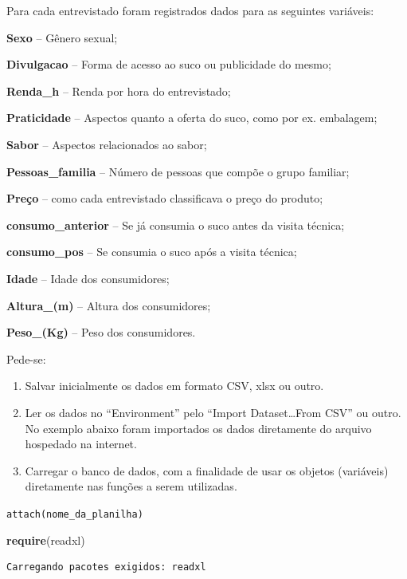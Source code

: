 \documentclass[12pt,brazil,]{book}
\newenvironment{Shaded}{\begin{snugshade}}{\end{snugshade}}
\newcommand{\KeywordTok}[1]{\textcolor[rgb]{0.13,0.29,0.53}{\textbf{#1}}}
\newcommand{\NormalTok}[1]{#1}
\begin{document}
Para cada entrevistado foram registrados dados para as seguintes
variáveis:

\textbf{Sexo} -- Gênero sexual;

\textbf{Divulgacao} -- Forma de acesso ao suco ou publicidade do mesmo;

\textbf{Renda\_h} -- Renda por hora do entrevistado;

\textbf{Praticidade} -- Aspectos quanto a oferta do suco, como por ex.
embalagem;

\textbf{Sabor} -- Aspectos relacionados ao sabor;

\textbf{Pessoas\_familia} -- Número de pessoas que compõe o grupo
familiar;

\textbf{Preço} -- como cada entrevistado classificava o preço do
produto;

\textbf{consumo\_anterior} -- Se já consumia o suco antes da visita
técnica;

\textbf{consumo\_pos} -- Se consumia o suco após a visita técnica;

\textbf{Idade} -- Idade dos consumidores;

\textbf{Altura\_(m)} -- Altura dos consumidores;

\textbf{Peso\_(Kg)} -- Peso dos consumidores.

Pede-se:

\begin{enumerate}
\def\labelenumi{\arabic{enumi}.}
\item
  Salvar inicialmente os dados em formato CSV, xlsx ou outro.
\item
  Ler os dados no ``Environment'' pelo ``Import Dataset\ldots{}From
  CSV'' ou outro. No exemplo abaixo foram importados os dados
  diretamente do arquivo hospedado na internet.
\item
  Carregar o banco de dados, com a finalidade de usar os objetos
  (variáveis) diretamente nas funções a serem utilizadas.
\end{enumerate}

\texttt{attach(nome\_da\_planilha)}

\begin{Shaded}
\begin{Highlighting}[]
\KeywordTok{require}\NormalTok{(readxl)}
\end{Highlighting}
\end{Shaded}

\begin{verbatim}
Carregando pacotes exigidos: readxl
\end{verbatim}
\end{document}
